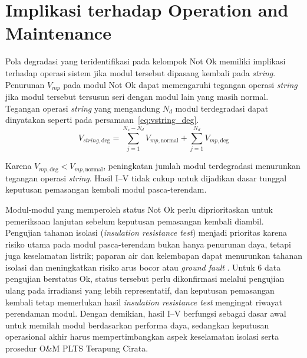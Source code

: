 \section{Implikasi terhadap Operation and Maintenance}

Pola degradasi yang teridentifikasi pada kelompok Not Ok memiliki implikasi
terhadap operasi sistem jika modul tersebut dipasang kembali pada
\textit{string}. Penurunan $V_{mp}$ pada modul Not Ok dapat memengaruhi
tegangan operasi \textit{string} jika modul tersebut tersusun seri dengan modul
lain yang masih normal. Tegangan operasi \textit{string} yang mengandung $N_d$
modul terdegradasi dapat dinyatakan seperti pada
persamaan~\eqref{eq:vstring_deg}.
\begin{equation}
V_{string,\text{deg}} =
\sum_{j=1}^{N_s-N_d} V_{mp,\text{normal}} +
\sum_{j=1}^{N_d} V_{mp,\text{deg}}
\label{eq:vstring_deg}
\end{equation}

Karena $V_{mp,\text{deg}} < V_{mp,\text{normal}}$, peningkatan jumlah modul
terdegradasi menurunkan tegangan operasi \textit{string}. Hasil I--V tidak
cukup untuk dijadikan dasar tunggal keputusan pemasangan kembali modul
pasca-terendam.

Modul-modul yang memperoleh status Not Ok perlu diprioritaskan untuk
pemeriksaan lanjutan sebelum keputusan pemasangan kembali diambil. Pengujian
tahanan isolasi (\textit{insulation resistance test}) menjadi prioritas karena
risiko utama pada modul pasca-terendam bukan hanya penurunan daya, tetapi juga
keselamatan listrik; paparan air dan kelembapan dapat menurunkan tahanan
isolasi dan meningkatkan risiko arus bocor atau \textit{ground fault}
\cite{ketjoy2022,smaGroundFault}. Untuk 6 data pengujian berstatus Ok, status
tersebut perlu dikonfirmasi melalui pengujian ulang pada irradiansi yang lebih
representatif, dan keputusan pemasangan kembali tetap memerlukan hasil
\textit{insulation resistance test} mengingat riwayat perendaman modul. Dengan
demikian, hasil I--V berfungsi sebagai dasar awal untuk memilah modul
berdasarkan performa daya, sedangkan keputusan operasional akhir harus
mempertimbangkan aspek keselamatan isolasi serta prosedur O\&M PLTS Terapung
Cirata.